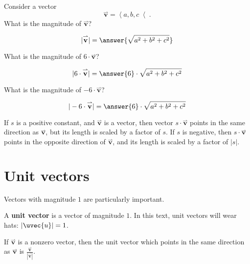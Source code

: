 \documentclass{ximera}
\begin{document}
\begin{question}
  Consider a vector
  \[
  \overset{\rightharpoonup}{\mathbf{v}} = \left\langle a,b,c \right\langle.
  \]
  What is the magnitude of $\overset{\rightharpoonup}{\mathbf{v}}$?
  \begin{prompt}
    \[
    |\overset{\rightharpoonup}{\mathbf{v}}| = \answer{\sqrt{a^2+b^2+c^2}}
    \]
  \end{prompt}
  \begin{question}
    What is the magnitude of $6\cdot\overset{\rightharpoonup}{\mathbf{v}}$?
    \begin{prompt}
      \[
      |6\cdot\overset{\rightharpoonup}{\mathbf{v}}| = \answer{6}\cdot\sqrt{a^2+b^2+c^2}
      \]
    \end{prompt}
    \begin{question}
    What is the magnitude of $-6\cdot\overset{\rightharpoonup}{\mathbf{v}}$?
    \begin{prompt}
      \[
      |-6\cdot\overset{\rightharpoonup}{\mathbf{v}}| = \answer{6}\cdot\sqrt{a^2+b^2+c^2}
      \]
    \end{prompt}
    \begin{feedback}
      If $s$ is a positive constant, and $\overset{\rightharpoonup}{\mathbf{v}}$ is a vector, then
      vector $s\cdot\overset{\rightharpoonup}{\mathbf{v}}$ points in the same direction as
      $\overset{\rightharpoonup}{\mathbf{v}}$, but its length is scaled by a factor of $s$.  If $s$
      is negative, then $s\cdot\overset{\rightharpoonup}{\mathbf{v}}$ points in the opposite
      direction of $\overset{\rightharpoonup}{\mathbf{v}}$, and its length is scaled by a factor of
      $|s|$.
    \end{feedback}
  \end{question}
  \end{question}
\end{question}


\section{Unit vectors}

Vectors with magnitude $1$ are particularly important.

\begin{definition}
  A \textbf{unit vector} is a vector of magnitude $1$. In this text, unit
  vectors will wear hats: $|\uvec{u}|=1$.
\end{definition}

\begin{theorem}
  If $\overset{\rightharpoonup}{\mathbf{v}}$ is a nonzero vector, then the unit vector which points
  in the same direction as $\overset{\rightharpoonup}{\mathbf{v}}$ is $\frac{\overset{\rightharpoonup}{\mathbf{v}}}{|\overset{\rightharpoonup}{\mathbf{v}}|}$.
\end{theorem}
\end{document}
